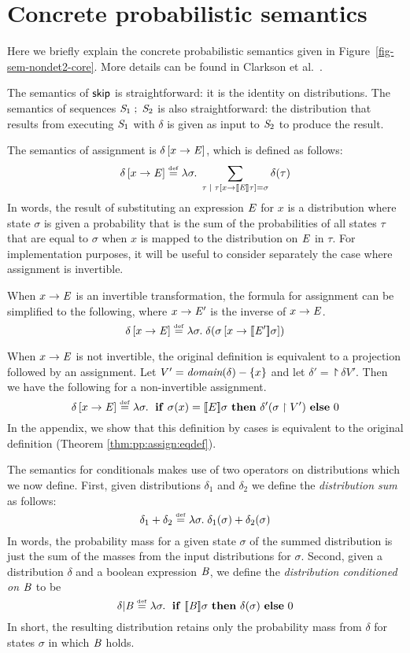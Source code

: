 \appendices

\vspace*{.1in}
\section{Concrete probabilistic semantics}
\label{appendix:concrete}

Here we briefly explain the concrete probabilistic semantics given in
Figure~\ref{fig-sem-nondet2-core}.  More details can be found in
Clarkson et al.~\cite{clarkson09quantifying}.

The semantics of $\mathsf{skip}$ is straightforward: it is the identity on
distributions.  The semantics of sequences ${\mathit{S}_1} \;;\; {\mathit{S}_2}$
is also straightforward: the distribution that results from executing
$\mathit{S}_1$ with $\delta$ is given as input to $\mathit{S}_2$ to produce
the result.

The semantics of assignment is $\delta \left[ x \rightarrow \mathit{E} \right]$, which is
defined as follows: 
$$ \delta \left[ x \rightarrow \mathit{E} \right] \stackrel{\smash{\scriptscriptstyle \mathrm{def}}}= \lambda \sigma . \; \sum_{\tau \; | \; \tau
  \left[ x \rightarrow [\![{\mathit{E}}]\!]{\tau} \right] = \sigma} \delta (\tau) $$ In
words, the result of substituting an expression $\mathit{E}$ for $x$ is a
distribution where state $\sigma$ is given a probability that is the
sum of the probabilities of all states $\tau$ that are equal to
$\sigma$ when $x$ is mapped to the distribution on $\mathit{E}$ in $\tau$.
For implementation purposes, it will be useful to consider separately the
case where assignment is invertible.

When $x \rightarrow \mathit{E}$ is an invertible transformation, the formula for assignment can be simplified to the following, where $x \rightarrow \mathit{E}'$ is the inverse of $x \rightarrow \mathit{E}$.
\[
\delta \left[ x \rightarrow \mathit{E} \right] \stackrel{\smash{\scriptscriptstyle \mathrm{def}}}= \lambda \sigma . \; \delta (\sigma\left[ x \rightarrow [\![{\mathit{E}'}]\!]{\sigma} \right])
\]

When $x \rightarrow \mathit{E}$ is not invertible, the original definition is equivalent to a projection followed by an assignment.  Let $V' = \textit{domain}(\delta) - \{x\}$ and let $\delta' = \project{\delta}{V'}$.  Then we have the following for a non-invertible assignment.
\[\delta \left[ x \rightarrow \mathit{E} \right] \stackrel{\smash{\scriptscriptstyle \mathrm{def}}}= \lambda \sigma . \; \text{ \textbf{if} } \sigma(x) = [\![{E}]\!]{\sigma}\text{ \textbf{then} }
\delta'(\sigma \upharpoonright V') \text{ \textbf{else} } 0 \]
In the appendix, we show that this definition by cases is
equivalent to the original definition (Theorem \ref{thm:pp:assign:eqdef}).

The semantics for conditionals makes use of two operators on
distributions which we now define.  First, given distributions
$\delta_1$ and $\delta_2$ we define the \emph{distribution sum} as
follows:
$$ \delta_1 + \delta_2 \stackrel{\smash{\scriptscriptstyle \mathrm{def}}}= \lambda \sigma . \; \delta_1(\sigma) +
\delta_2(\sigma) $$ In words, the probability mass for a given state
$\sigma$ of the summed distribution is just the sum of the masses from
the input distributions for $\sigma$.  Second, given a distribution
$\delta$ and a boolean expression $\mathit{B}$, we define the
\emph{distribution conditioned on $\mathit{B}$} to be
$$ \delta | \mathit{B} \stackrel{\smash{\scriptscriptstyle \mathrm{def}}}= \lambda \sigma . \; \text{ \textbf{if} } [\![{\mathit{B}}]\!]{\sigma} \text{ \textbf{then} }
\delta(\sigma) \text{ \textbf{else} } 0 $$
In short, the resulting distribution retains only the probability mass
from $\delta$ for states $\sigma$ in which $\mathit{B}$
holds.

